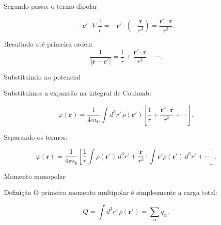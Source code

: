 \documentclass[aspectratio=169]{beamer}
\begin{document}
\begin{frame}{Segundo passo: o termo dipolar}

\begin{eqbox}
\begin{equation}
-\mathbf r'\cdot \nabla\frac{1}{r}
=
-\mathbf r'\cdot
\left(
-\frac{\mathbf r}{r^3}
\right)
=
\frac{\mathbf r'\cdot \mathbf r}{r^3}.
\label{eq:termo_dipolar_kernel}
\end{equation}
\end{eqbox}

\begin{mybox}{Resultado até primeira ordem}
\[
\frac{1}{|\mathbf r-\mathbf r'|}
=
\frac{1}{r}
+
\frac{\mathbf r'\cdot\mathbf r}{r^3}
+\cdots .
\]
\end{mybox}

\end{frame}

\begin{frame}{Substituindo no potencial}

Substituímos a expansão na integral de Coulomb:

\begin{eqbox}
\begin{equation}
\varphi(\mathbf r)
=
\frac{1}{4\pi\epsilon_0}
\int d^3r'\,\rho(\mathbf r')
\left[
\frac{1}{r}
+
\frac{\mathbf r'\cdot\mathbf r}{r^3}
+\cdots
\right].
\label{eq:potencial_expandido_inicial}
\end{equation}
\end{eqbox}

Separando os termos:

\begin{eqbox}
\begin{equation}
\varphi(\mathbf r)
=
\frac{1}{4\pi\epsilon_0}
\left[
\frac{1}{r}
\int \rho(\mathbf r')\,d^3r'
+
\frac{\mathbf r}{r^3}\cdot
\int \mathbf r'\rho(\mathbf r')\,d^3r'
+\cdots
\right].
\tag{4.3}
\label{eq:potencial_expandido}
\end{equation}
\end{eqbox}

\end{frame}

\begin{frame}{Momento monopolar}

\begin{mybox}{Definição}
O primeiro momento multipolar é simplesmente a carga total:
\end{mybox}

\begin{eqbox}
\begin{equation}
Q
=
\int d^3r'\,\rho(\mathbf r')
=
\sum_\alpha q_\alpha .
\tag{4.4}
\label{eq:monopolo}
\end{equation}
\end{eqbox}


\end{frame}
\end{document}
